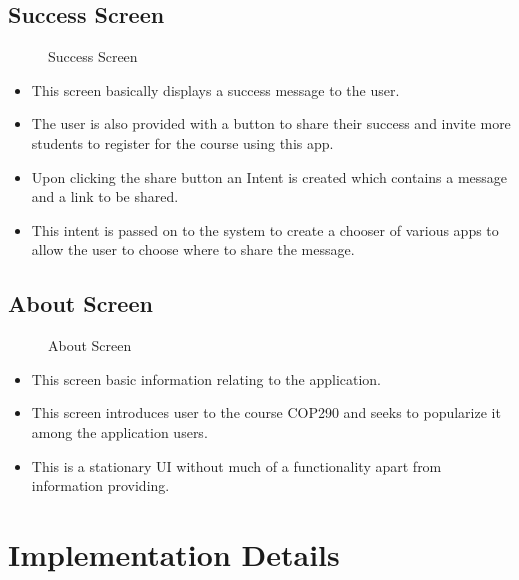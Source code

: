 \documentclass[12pt]{article}
\begin{document}
\subsection{Success Screen}

\begin{figure}[!ht]
	\centering
	\caption{Success Screen}
\end{figure}

\begin{itemize}
\setlength\itemsep{-0.4em}
\item This screen basically displays a success message to the user.
\item The user is also provided with a button to share their success and invite more students to register for the course using this app.
\end{itemize}

\begin{itemize}
\setlength\itemsep{-0.4em}
\item Upon clicking the share button an Intent is created which contains a message and a link to be shared.
\item This intent is passed on to the system to create a chooser of various apps to allow the user to choose where to share the message.
\end{itemize}


\subsection{About Screen}

\begin{figure}[!ht]
	\centering
	\caption{About Screen}
\end{figure}

\begin{itemize}
\setlength\itemsep{-0.4em}
\item This screen basic information relating to the application.
\item This screen introduces user to the course COP290 and seeks to popularize it among the application users.
\item This is a stationary UI without much of a functionality apart from information providing.
\end{itemize}




\section{Implementation Details}
\end{document}
